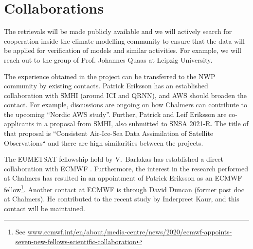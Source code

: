 \documentclass[12pt,oneside,a4paper]{article}
\begin{document}


\section{Collaborations}
%
\label{sec:collaborations}
The retrievals will be made publicly available and we will actively search
for cooperation inside the climate modelling community to ensure that the 
data will be applied for verification of models and similar activities. For example, we will reach out to the group of Prof. Johannes Quaas at Leipzig University. 

The experience obtained in the project can be transferred to the NWP community
by existing contacts. Patrick Eriksson has an established collaboration with
SMHI (around ICI and QRNN), and AWS should broaden the contact. For example,
discussions are ongoing on how Chalmers can contribute to the upcoming
``Nordic AWS study''. Further, Patrick and Leif Eriksson are co-applicants in a
proposal from SMHI, also submitted to SNSA 2021-R. The title of that proposal
is ``Consistent Air-Ice-Sea Data Assimilation of Satellite Observations`` and
there are high similarities between the projects.

The EUMETSAT fellowship hold by V.\ Barlakas has established a direct
collaboration with ECMWF \citep{barlakas:intro:21}. Furthermore, the interest
in the research performed at Chalmers has resulted in an appointment of Patrick
Eriksson  as an ECMWF fellow\footnote{See 
	\url{www.ecmwf.int/en/about/media-centre/news/2020/ecmwf-appoints-seven-new-fellows-scientific-collaboration}}.
Another contact at ECMWF is through David Duncan (former post doc at Chalmers).
He contributed to the recent study by Inderpreet Kaur, and this contact will be
maintained.
\end{document}
